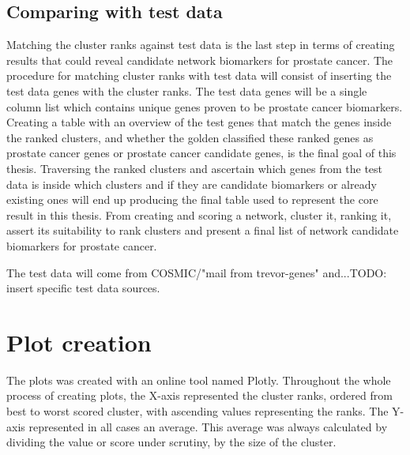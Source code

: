 \subsection{Comparing with test data}
Matching the cluster ranks against test data is the last step in terms of
creating results that could reveal candidate network biomarkers for prostate
cancer. The procedure for matching cluster ranks with test data will consist of
inserting the test data genes with the cluster ranks. The test data genes will
be a single column list which contains unique genes proven to be prostate cancer
biomarkers. Creating a table with an overview of the test genes that match
the genes inside the ranked clusters, and whether the \gls{golden} classified
these ranked genes as prostate cancer genes or prostate cancer candidate genes,
is the final goal of this thesis. Traversing the ranked clusters and ascertain
which genes from the test data is inside which clusters and if they are
candidate biomarkers or already existing ones will end up producing the final
table used to represent the core result in this thesis. From creating and
scoring a network, cluster it, ranking it, assert its suitability to rank
clusters and present a final list of network candidate biomarkers for prostate
cancer.

The test data will come from COSMIC/"mail from
trevor-genes" and...TODO: insert specific test data sources.

\section{Plot creation}
The plots was created with an online tool named Plotly\cite{plotly}. Throughout
the whole process of creating plots, the X-axis represented the cluster ranks,
ordered from best to worst scored cluster, with ascending values representing
the ranks. The Y-axis represented in all cases an average. This average was
always calculated by dividing the value or score under scrutiny, by the size of
the cluster.

